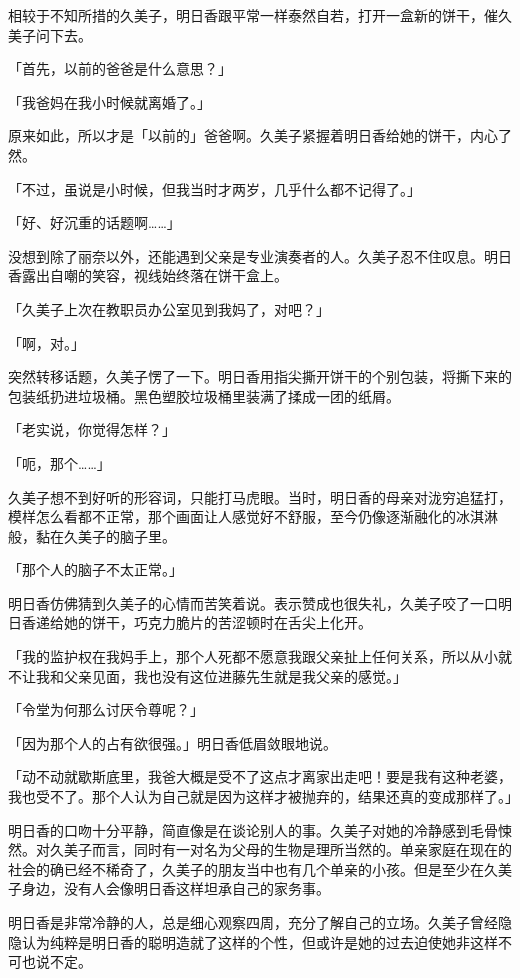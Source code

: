 \documentclass[UTF8]{ctexart}
\begin{document}
    相较于不知所措的久美子，明日香跟平常一样泰然自若，打开一盒新的饼干，催久美子问下去。 

    「首先，以前的爸爸是什么意思？」 

    「我爸妈在我小时候就离婚了。」 

    原来如此，所以才是「以前的」爸爸啊。久美子紧握着明日香给她的饼干，内心了然。 

    「不过，虽说是小时候，但我当时才两岁，几乎什么都不记得了。」 

    「好、好沉重的话题啊……」 

    没想到除了丽奈以外，还能遇到父亲是专业演奏者的人。久美子忍不住叹息。明日香露出自嘲的笑容，视线始终落在饼干盒上。 

    「久美子上次在教职员办公室见到我妈了，对吧？」 

    「啊，对。」 

    突然转移话题，久美子愣了一下。明日香用指尖撕开饼干的个别包装，将撕下来的包装纸扔进垃圾桶。黑色塑胶垃圾桶里装满了揉成一团的纸屑。 

    「老实说，你觉得怎样？」 

    「呃，那个……」 

    久美子想不到好听的形容词，只能打马虎眼。当时，明日香的母亲对泷穷追猛打，模样怎么看都不正常，那个画面让人感觉好不舒服，至今仍像逐渐融化的冰淇淋般，黏在久美子的脑子里。 

    「那个人的脑子不太正常。」 

    明日香仿佛猜到久美子的心情而苦笑着说。表示赞成也很失礼，久美子咬了一口明日香递给她的饼干，巧克力脆片的苦涩顿时在舌尖上化开。 

    「我的监护权在我妈手上，那个人死都不愿意我跟父亲扯上任何关系，所以从小就不让我和父亲见面，我也没有这位进藤先生就是我父亲的感觉。」 

    「令堂为何那么讨厌令尊呢？」 

    「因为那个人的占有欲很强。」明日香低眉敛眼地说。 

    「动不动就歇斯底里，我爸大概是受不了这点才离家出走吧！要是我有这种老婆，我也受不了。那个人认为自己就是因为这样才被抛弃的，结果还真的变成那样了。」 

    明日香的口吻十分平静，简直像是在谈论别人的事。久美子对她的冷静感到毛骨悚然。对久美子而言，同时有一对名为父母的生物是理所当然的。单亲家庭在现在的社会的确已经不稀奇了，久美子的朋友当中也有几个单亲的小孩。但是至少在久美子身边，没有人会像明日香这样坦承自己的家务事。 

    明日香是非常冷静的人，总是细心观察四周，充分了解自己的立场。久美子曾经隐隐认为纯粹是明日香的聪明造就了这样的个性，但或许是她的过去迫使她非这样不可也说不定。 
\end{document}
